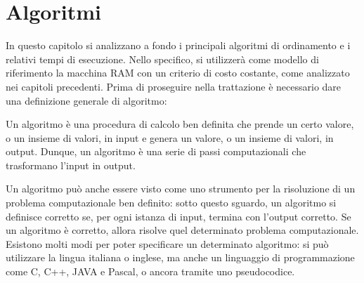 \chapter{Algoritmi}
In questo capitolo si analizzano a fondo i principali algoritmi di ordinamento e i relativi tempi di esecuzione. Nello specifico, si utilizzerà come modello di riferimento la macchina RAM con un criterio di costo costante, come analizzato nei capitoli precedenti. Prima di proseguire nella trattazione è necessario dare una definizione generale di algoritmo:

\begin{definition}
  Un algoritmo è una procedura di calcolo ben definita che prende un certo valore, o un insieme di valori, in input e genera un valore, o un insieme di valori, in output. Dunque, un algoritmo è una serie di passi computazionali che trasformano l'input in output.
\end{definition}

Un algoritmo può anche essere visto come uno strumento per la risoluzione di un problema computazionale ben definito: sotto questo sguardo, un algoritmo si definisce corretto se, per ogni istanza di input, termina con l'output corretto. Se un algoritmo è corretto, allora risolve quel determinato problema computazionale. Esistono molti modi per poter specificare un determinato algoritmo: si può utilizzare la lingua italiana o inglese, ma anche un linguaggio di programmazione come C, C++, JAVA e Pascal, o ancora tramite uno pseudocodice.

